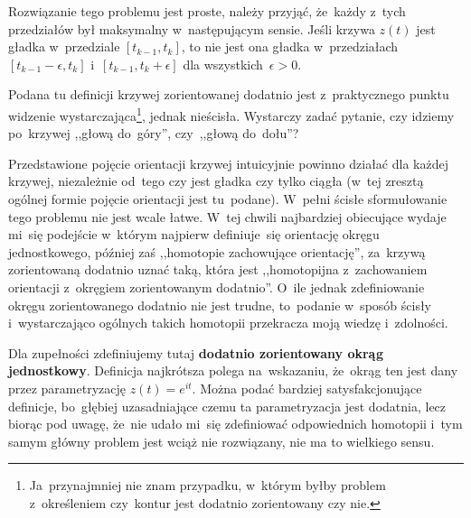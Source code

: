 \documentclass[a4paper,11pt]{article}
\begin{document}
Rozwiązanie tego problemu jest proste, należy przyjąć, że~każdy z~tych
przedziałów był maksymalny w~następującym sensie. Jeśli krzywa
$z( t )$ jest gładka w~przedziale $[ t_{ k - 1 }, t_{ k } ]$, to nie
jest ona gładka w~przedziałach $[ t_{ k - 1 } - \epsilon, t_{ k } ]$
i~$[ t_{ k - 1 }, t_{ k } + \epsilon ]$ dla wszystkich~$\epsilon > 0$.

\vspace{\spaceFour}


\start {} Podana tu definicji krzywej zorientowanej dodatnio
jest z~praktycznego punktu widzenie
wystarczająca\footnote{Ja~przynajmniej nie znam przypadku, w~którym
  byłby problem z~określeniem czy~kontur jest dodatnio zorientowany
  czy nie.}, jednak nieścisła. Wystarczy zadać pytanie, czy idziemy
po~krzywej ,,głową do~góry'', czy~,,głową do~dołu''?

Przedstawione pojęcie orientacji krzywej intuicyjnie powinno działać
dla każdej krzywej, niezależnie od~tego czy jest gładka czy tylko
ciągła (w~tej zresztą ogólnej formie pojęcie orientacji jest
tu~podane). W~pełni ścisłe sformułowanie tego problemu nie jest wcale
łatwe. W~tej chwili najbardziej obiecujące wydaje mi~się podejście
w~którym najpierw definiuje~się orientację okręgu jednostkowego,
później zaś ,,homotopie zachowujące orientację'', za~krzywą
zorientowaną dodatnio uznać taką, która jest ,,homotopijna
z~zachowaniem orientacji z~okręgiem zorientowanym dodatnio''. O~ile
jednak zdefiniowanie okręgu zorientowanego dodatnio nie jest trudne,
to~podanie w~sposób ścisły i~wystarczająco ogólnych takich homotopii
przekracza moją wiedzę i~zdolności.

Dla zupełności zdefiniujemy tutaj \textbf{dodatnio zorientowany okrąg
  jednostkowy}. Definicja najkrótsza polega na~wskazaniu, że~okrąg ten
jest dany przez parametryzację $z( t ) = e^{ i t }$. Można podać
bardziej satysfakcjonujące definicje, bo~głębiej uzasadniające czemu
ta parametryzacja jest dodatnia, lecz biorąc pod uwagę, że~nie udało
mi~się zdefiniować odpowiednich homotopii i~tym samym główny problem
jest wciąż nie rozwiązany, nie ma to wielkiego sensu.

\vspace{\spaceFour}
\end{document}
